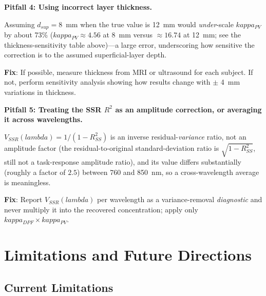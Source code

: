 \documentclass[12pt]{article}
\def\kappa{kappa}%
\def\lambda{lambda}%
\def\mathrm#1{#1}%
\def\text#1{#1}%
\begin{document}
\begin{caution}
\textbf{Pitfall 4: Using incorrect layer thickness.}

Assuming $d_{\text{sup}} = 8$~mm when the true value is 12~mm would \emph{under}-scale $\kappa_{\text{PV}}$ by about 73\% ($\kappa_{\text{PV}}\approx4.56$ at 8~mm versus $\approx16.74$ at 12~mm; see the thickness-sensitivity table above)---a large error, underscoring how sensitive the correction is to the assumed superficial-layer depth.

\textbf{Fix}: If possible, measure thickness from MRI or ultrasound for each subject. If not, perform sensitivity analysis showing how results change with $\pm$ 4~mm variations in thickness.
\end{caution}

\begin{caution}
\textbf{Pitfall 5: Treating the SSR $R^2$ as an amplitude correction, or averaging it across wavelengths.}

$V_{\mathrm{SSR}}(\lambda)=1/(1-R^2_{\mathrm{SS}})$ is an inverse residual-\emph{variance} ratio, not an amplitude factor (the residual-to-original standard-deviation ratio is $\sqrt{1-R^2_{\mathrm{SS}}}$, still not a task-response amplitude ratio), and its value differs substantially (roughly a factor of $2.5$) between 760 and 850~nm, so a cross-wavelength average is meaningless.

\textbf{Fix}: Report $V_{\mathrm{SSR}}(\lambda)$ per wavelength as a variance-removal \emph{diagnostic} and never multiply it into the recovered concentration; apply only $\kappa_{\text{DPF}}\times\kappa_{\text{PV}}$.
\end{caution}

\section{Limitations and Future Directions}

\subsection{Current Limitations}
\end{document}
